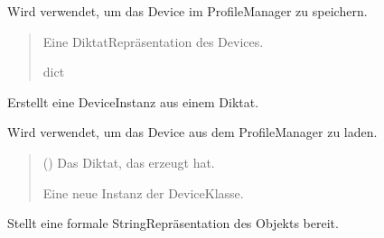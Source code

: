\documentclass[letterpaper,10pt,english]{sphinxmanual}
\begin{document}
\begin{fulllineitems}
\begin{fulllineitems}
\sphinxAtStartPar
Wird verwendet, um das Device im ProfileManager zu speichern.
\begin{quote}\begin{description}
\sphinxAtStartPar
Eine Diktat\sphinxhyphen{}Repräsentation des Devices.

\sphinxAtStartPar
dict

\end{description}\end{quote}

\end{fulllineitems}


\begin{fulllineitems}
\label{\detokenize{modulab/device_manager:modules.device.DeviceManager.Device.from_dict}}
\pysigstartsignatures
\pysiglinewithargsret
{}
{}
{}
\pysigstopsignatures
\sphinxAtStartPar
Erstellt eine Device\sphinxhyphen{}Instanz aus einem Diktat.

\sphinxAtStartPar
Wird verwendet, um das Device aus dem ProfileManager zu laden.
\begin{quote}\begin{description}
\sphinxAtStartPar
{} () \textendash{} Das Diktat, das  erzeugt hat.

\sphinxAtStartPar
Eine neue Instanz der Device\sphinxhyphen{}Klasse.

\sphinxAtStartPar
{\hyperref[\detokenize{modulab/device_manager:modules.device.DeviceManager.Device}]{}}

\end{description}\end{quote}

\end{fulllineitems}


\begin{fulllineitems}
\label{\detokenize{modulab/device_manager:modules.device.DeviceManager.Device.__repr__}}
\pysigstartsignatures
\pysiglinewithargsret
{}
{}
{}
\pysigstopsignatures
\sphinxAtStartPar
Stellt eine formale String\sphinxhyphen{}Repräsentation des Objekts bereit.

\end{fulllineitems}


\end{fulllineitems}
\end{document}
